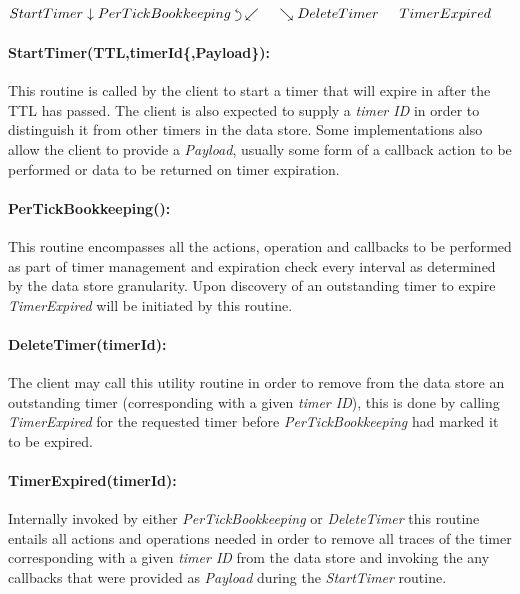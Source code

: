 \documentclass[acmsmall]{acmart} %
\newcommand{\backtrackarrow}{\rotatebox[origin=c]{-90}{$\curvearrowleft$}}
\begin{document}
\begin{center}
	$
	StartTimer \linebreak 
	\downarrow \linebreak  
	PerTickBookkeeping \hspace{1mm} \backtrackarrow \linebreak 
	\swarrow  \hspace{15pt}  \searrow \linebreak 
	DeleteTimer \hspace{15pt} TimerExpired
	$
\end{center}


\paragraph{StartTimer(TTL,timerId\{,Payload\}):} This routine is called by the client to start a timer that will expire in after the TTL has passed. The client is also expected to supply a \textit{timer ID} in order to distinguish it from other timers in the data store. Some implementations also allow the client to provide a \textit{Payload}, usually some form of a callback action to be performed or data to be returned on timer expiration.

\paragraph{PerTickBookkeeping():} This routine encompasses all the actions, operation and callbacks to be performed as part of timer management and expiration check every interval as determined by the data store granularity. Upon discovery of an outstanding timer to expire \textit{TimerExpired} will be initiated by this routine.

\paragraph{DeleteTimer(timerId):} The client may call this utility routine in order to remove from the data store an outstanding timer (corresponding with a given \textit{timer ID}), this is done by calling \textit{TimerExpired} for the requested timer before \textit{PerTickBookkeeping} had marked it to be expired.

\paragraph{TimerExpired(timerId):} Internally invoked by either \textit{PerTickBookkeeping} or \textit{DeleteTimer} this routine entails all actions and operations needed in order to remove all traces of the timer corresponding with a given \textit{timer ID} from the data store and invoking the any callbacks that were provided as \textit{Payload} during the \textit{StartTimer} routine.
\end{document}
